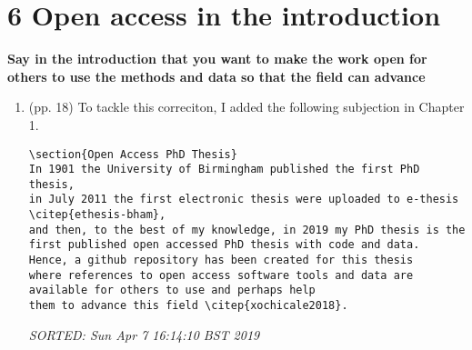 \documentclass[12pt]{article}
\begin{document}
\section*{6 Open access in the introduction}
\textbf{
Say in the introduction that you want to make
the work open for others to use the methods 
and data so that the field can advance
}

\begin{enumerate}

\item  (pp. 18)  To tackle this correciton, 
	I added the following subjection in Chapter 1. 

	\begin{verbatim}
\section{Open Access PhD Thesis}
In 1901 the University of Birmingham published the first PhD thesis, 
in July 2011 the first electronic thesis were uploaded to e-thesis 
\citep{ethesis-bham}, 
and then, to the best of my knowledge, in 2019 my PhD thesis is the 
first published open accessed PhD thesis with code and data.
Hence, a github repository has been created for this thesis 
where references to open access software tools and data are 
available for others to use and perhaps help 
them to advance this field \citep{xochicale2018}.

	\end{verbatim}
	\textit{
	SORTED:  Sun Apr  7 16:14:10 BST 2019
	}
	\\


\end{enumerate}



\end{document}
